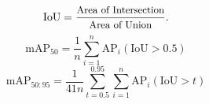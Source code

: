 \begin{equation}
    \text{IoU} = \frac{\text{\small{Area of Intersection}}}{\text{\small{Area of Union}}}.
\end{equation}
\begin{equation}
    \text{mAP}_{50} = \frac{1}{n} \sum_{i=1}^{n} \text{AP}_{i}(\text{IoU} > 0.5)
\end{equation}
\begin{equation}
    \text{mAP}_{50:95} = \frac{1}{41n} \sum_{t=0.5}^{0.95} \sum_{i=1}^{n} \text{AP}_{i}(\text{IoU} > t)
\end{equation}
